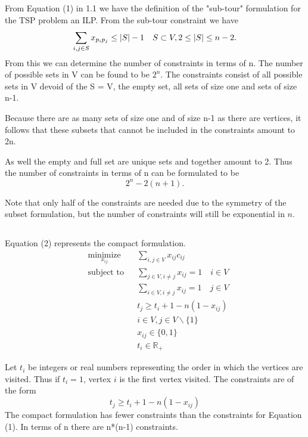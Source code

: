 \documentclass[11pt,a4paper,english]{article}
\begin{document}
\subsection{}
From Equation (1) in 1.1 we have the definition of the "sub-tour" formulation for the TSP problem an ILP. From the sub-tour constraint we have 
$$\sum_{i,j \in S} x_{p_i p_j} \leq |S| - 1 \quad S \subset V, 2 \leq |S| \leq n-2\mathnormal{.}$$
From this we can determine the number of constraints in terms of n.
The number of possible sets in V can be found to be $2^n$. 
The constraints consist of all possible sets in V devoid of the S = V, the empty set, all sets of size one and sets of size n-1. 

Because there are as many sets of size one and of size n-1 as there are vertices, it follows that these subsets that cannot be included in the constraints amount to 2n. 

As well the empty and full set are unique sets and together amount to 2. 
Thus the number of constraints in terms of n can be formulated to be $$2^n - 2(n+1).$$

Note that only half of the constraints are needed due to the symmetry of the subset formulation\citep[Observation 10.2]{Wolsey}, but the number of constraints will still be exponential in $n$.

\subsection{}
Equation (2) represents the compact formulation.  
 \begin{equation}
   \label{eq:tsp:subtour}
   \begin{aligned}
     & \underset{x_{ij}}{\text{minimize}}
     & & \sum_{i,j \in V} x_{ij}c_{ij} \\
     & \text{subject to}
     & & \sum_{j \in V, i \neq j} x_{ij} = 1 \quad i \in V \\
     & & & \sum_{i \in V, i \neq j} x_{ij} = 1 \quad j \in V \\
     & & & t_{j} \geq t_{i} + 1 - n(1-x_{ij} )\\
     & & & i\in V, j\in V \backslash \{1\} \\
     & & & x_{ij} \in \{0,1\}\\
     & & & t_{i}\in\mathbb{R}_+
   \end{aligned}
 \end{equation}
 
 Let $t_{i}$ be integers or real numbers representing the order in which the vertices are visited. Thus if $t_{i} = 1$, vertex $i$ is the first vertex visited.
The constraints are of the form $$t_{j} \geq t_{i} + 1 - n(1-x_{ij} )$$ The compact formulation has fewer constraints than the constraints for Equation (1).
In terms of n there are n*(n-1) constraints.
\end{document}

